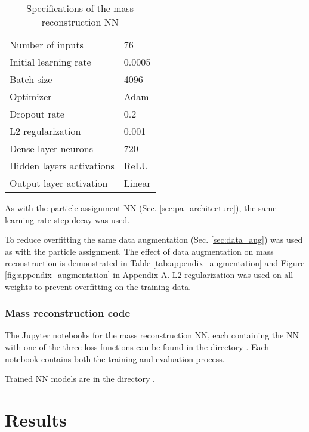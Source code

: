 \documentclass{ctuthesis}
\begin{document}
\begin{table}[H]
\begin{ctucolortab}
\begin{tabular}{  R{4.2cm} | R{4.2cm}  } 
    \toprule
    Number of inputs         & 76      \\ 
    Initial learning rate    & 0.0005  \\ 
    Batch size               & 4096  \\ 
    Optimizer                & Adam    \\ 
    Dropout rate             & 0.2     \\ 
    L2 regularization        & 0.001     \\ 
    Dense layer neurons      & 720     \\
    Hidden layers activations & ReLU    \\ 
    Output layer activation  & Linear \\
    \bottomrule
\end{tabular}
\end{ctucolortab}
\caption{Specifications of the mass reconstruction NN}
\label{m_r_specifications}
\end{table}
As with the particle assignment NN (Sec. \ref{sec:pa_architecture}), the same learning rate step decay was used.

To reduce overfitting the same data augmentation (Sec. \ref{sec:data_aug}) was used as with the particle assignment. The effect of data augmentation on mass reconstruction is demonstrated in Table \ref{tab:appendix_augmentation} and Figure \ref{fig:appendix_augmentation} in Appendix A. L2 regularization was used on all weights to prevent overfitting on the training data. 
\subsection{Mass reconstruction code}
The Jupyter notebooks for the mass reconstruction NN, each containing the NN with one of the three loss functions can be found in the directory . Each notebook contains both the training and evaluation process.

Trained NN models are in the directory .

\chapter{Results}
\end{document}
